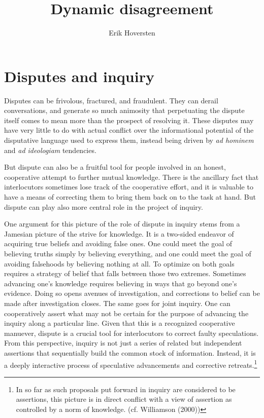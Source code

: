\documentclass[letterpaper,10pt]{article}
\title{Dynamic disagreement}
\author{Erik Hoversten}
\begin{document}
\maketitle

\begin{abstract}
\end{abstract}

\section{Disputes and inquiry}

Disputes can be frivolous, fractured, and fraudulent. They can derail conversations, and generate so much animosity that perpetuating the dispute itself comes to mean more than the prospect of resolving it.  These disputes may have very little to do with actual conflict over the informational potential of the disputative language used to express them, instead being driven by \textit{ad hominem} and \textit{ad ideologiam} tendencies.

But dispute can also be a fruitful tool for people involved in an honest, cooperative attempt to further mutual knowledge. There is the ancillary fact that interlocutors sometimes lose track of the cooperative effort, and it is valuable to have a means of correcting them to bring them back on to the task at hand.  But dispute can play also more central role in the project of inquiry.  

One argument for this picture of the role of dispute in inquiry stems from a Jamesian picture of the strive for knowledge. It is a two-sided endeavor of acquiring true beliefs and avoiding false ones.  One could meet the goal of believing truths simply by believing everything, and one could meet the goal of avoiding falsehoods by believing nothing at all.  To optimize on both goals requires a strategy of belief that falls between those two extremes.  Sometimes advancing one's knowledge requires believing in ways that go beyond one's evidence.  Doing so opens avenues of investigation, and corrections to belief can be made after investigation closes.  The same goes for joint inquiry.  One can cooperatively assert what may not be certain for the purpose of advancing the inquiry along a particular line.  Given that this is a recognized cooperative manuever, dispute is a crucial tool for interlocutors to correct faulty speculations.  From this perspective, inquiry is not just a series of related but independent assertions that sequentially build the common stock of information.  Instead, it is a deeply interactive process of speculative advancements and corrective retreats.\footnote{In so far as such proposals put forward in inquiry are considered to be assertions, this picture is in direct conflict with a view of assertion as controlled by a norm of knowledge. (cf. Williamson (2000))}
\end{document}

